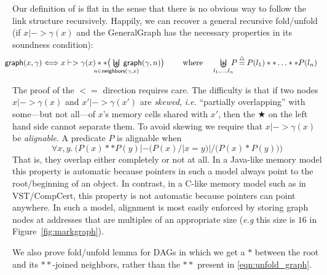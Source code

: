 Our definition of  is flat in the sense that there is no obvious way to follow the link structure recursively.  Happily, we can recover a general recursive fold/unfold (if $x |-> \gamma(x)$ and the GeneralGraph has the necessary properties in its soundness condition):
\vspace{-1ex}
\begin{equation}
\label{eqn:unfold_graph}
\hspace{-1em}\begin{array}{@{}lc@{\hspace{1pt}}c@{\hspace{1pt}}l@{}}
\p{graph}(x,\gamma)  <=>  x |-> \gamma(x) ** \big(\!\!\!\!\!\!\!\!\!\!\!\!\!\underset{n \in \p{neighbors}(\gamma,x)}{\bigocon}\!\!\!\!\!\!\!\!\!\!\!\! \p{graph}(\gamma,n) \big)
\quad \text{~~~ where ~~ }\underset{l_1,\dots,l_n}{\raisebox{-0.3ex}{\resizebox{0.75em}{!}{\hspace{0.05em}$\scon$}}\hspace{-2.18ex} \bigcup} \! \! P  \defeq  P(l_1) ** \ldots ** P(l_n) \end{array}
\vspace{-1ex}
\end{equation}

The proof of the $<=$ direction requires care. The difficulty is that if two nodes $x |-> \gamma(x)$ and $x' |-> \gamma(x')$ are \emph{skewed}, \emph{i.e.} ``partially overlapping'' with some---but not all---of $x$'s memory cells shared with $x'$, then the $\bigstar$ on the left hand side cannot separate them.  To avoid skewing we require that $x |-> \gamma(x)$ be \emph{alignable}. A predicate $P$ is alignable when
\[
\forall x,y.~ \Big(P(x) ** P(y) |- \big(P(x) /| x = y\big) |/ \big(P(x) * P(y)\big)\Big)
\]
That is, they overlap either completely or not at all. In a Java-like memory model this property is automatic because pointers in such a model always point to the root/beginning of an object.  In contrast, in a C-like memory model such as in VST/CompCert, this property is not automatic because pointers can point anywhere.  In such a model, alignment is most easily enforced by storing graph nodes at addresses that are multiples of an appropriate size (\emph{e.g} this size is $16$ in Figure~\ref{fig:markgraph}).

 We also prove fold/unfold lemma for DAGs in which we get a $*$ between the root and its $**$-joined neighbors, rather than the $**$ present in \eqref{eqn:unfold_graph}.


